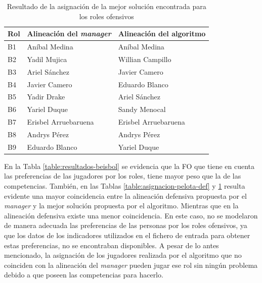 \begin{table}[H]
	\centering
	\caption{Resultado de la asignación de la mejor solución encontrada para los roles ofensivos}\label{table:asignacion-pelota-of}
	\begin{tabular}{l l l }
		\toprule
		\textbf{Rol}          & \textbf{Alineación del \textit{manager}} & \textbf{Alineación del algoritmo} \\ \midrule
		\rowcolor{gray!30}B1  & Aníbal Medina                            & Aníbal Medina                     \\
		B2                    & Yadil Mujica                             & Willian Campillo                  \\
		B3                    & Ariel Sánchez                            & Javier Camero                     \\
		B4                    & Javier Camero                            & Eduardo Blanco                    \\
		B5                    & Yadir Drake                              & Ariel Sánchez                     \\
		B6                    & Yariel Duque                             & Sandy Menocal                     \\
		\rowcolor{gray!30}	B7 & Erisbel Arruebaruena                     & Erisbel Arruebaruena              \\
		\rowcolor{gray!30}	B8 & Andrys Pérez                             & Andrys Pérez                      \\
		B9                    & Eduardo Blanco                           & Yariel Duque                      \\ \bottomrule
	\end{tabular}
\end{table}

En la Tabla \ref{table:resultados-beisbol} se evidencia que la FO que tiene en cuenta las preferencias de las jugadores por los roles, tiene mayor peso que la de las competencias. También, en las Tablas \ref{table:asignacion-pelota-def}  y \ref{table:asignacion-pelota-of} resulta evidente una mayor coincidencia entre la alineación defensiva propuesta por el \textit{manager} y la mejor solución propuesta por el algoritmo. Mientras que en la alineación defensiva existe una menor coincidencia. En este caso, no se modelaron de manera adecuada las preferencias de las personas por los roles ofensivos, ya que los datos de los indicadores utilizados en el fichero de entrada para obtener estas preferencias, no se encontraban disponibles. A pesar de lo antes mencionado, la asignación de los jugadores realizada por el algoritmo que no coinciden con la alineación del \textit{manager} pueden jugar ese rol sin ningún problema debido a que poseen las competencias para hacerlo.

